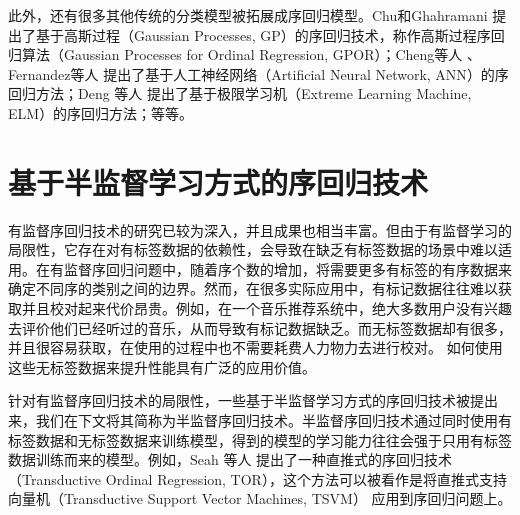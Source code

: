 此外，还有很多其他传统的分类模型被拓展成序回归模型。Chu和Ghahramani\citep{chu2005gaussian}
提出了基于高斯过程（Gaussian Processes, GP\citep{rasmussen2006gaussian}）的序回归技术，称作高斯过程序回归算法（Gaussian Processes for Ordinal Regression, GPOR）；Cheng等人\citep{cheng2008neural}
、Fernandez等人\citep{fernandez2013negative}
提出了基于人工神经网络（Artificial Neural Network, ANN\citep{jain1996artificial}）的序回归方法；Deng 等人\citep{deng2010ordinal}
提出了基于极限学习机（Extreme Learning Machine,  ELM\citep{huang2006extreme}）的序回归方法；等等。

\section{基于半监督学习方式的序回归技术}
有监督序回归技术的研究已较为深入，并且成果也相当丰富。但由于有监督学习的局限性，它存在对有标签数据的依赖性，会导致在缺乏有标签数据的场景中难以适用。在有监督序回归问题中，随着序个数的增加，将需要更多有标签的有序数据来确定不同序的类别之间的边界。然而，在很多实际应用中，有标记数据往往难以获取并且校对起来代价昂贵。例如，在一个音乐推荐系统中，绝大多数用户没有兴趣去评价他们已经听过的音乐，从而导致有标记数据缺乏。而无标签数据却有很多，并且很容易获取，在使用的过程中也不需要耗费人力物力去进行校对。 如何使用这些无标签数据来提升性能具有广泛的应用价值。

针对有监督序回归技术的局限性，一些基于半监督学习方式的序回归技术被提出来，我们在下文将其简称为半监督序回归技术。半监督序回归技术通过同时使用有标签数据和无标签数据来训练模型，得到的模型的学习能力往往会强于只用有标签数据训练而来的模型。例如，Seah 等人\citep{seah2012transductive}
提出了一种直推式的序回归技术（Transductive Ordinal Regression, TOR），这个方法可以被看作是将直推式支持向量机（Transductive Support Vector Machines, TSVM\citep{joachims1999transductive}）
应用到序回归问题上。

